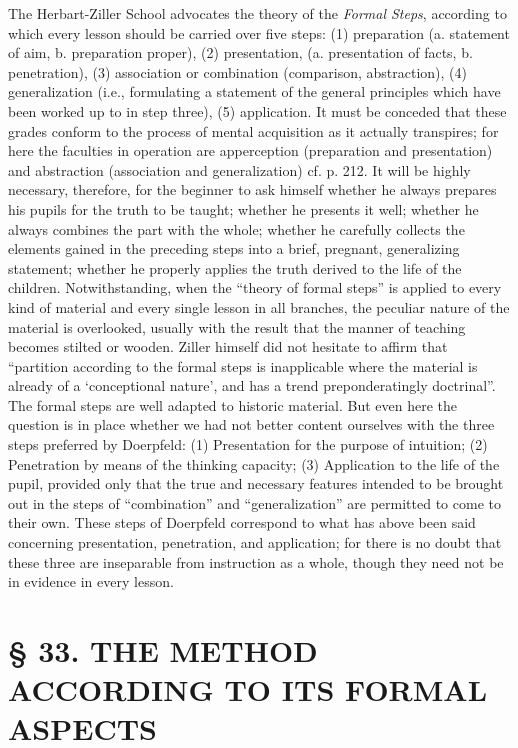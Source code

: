 The Herbart-Ziller School advocates the theory of the \emph{Formal Steps}, according to which every lesson should be carried over five steps: (1) preparation (a. statement of aim, b. preparation proper), (2) presentation, (a. presentation of facts, b. penetration), (3) association or combination (comparison,
abstraction), (4) generalization (i.e., formulating a statement of the general principles which have been worked up to in step three), (5) application. It must be conceded that these grades conform to the process of mental acquisition as it actually transpires; for here the faculties in operation are apperception (preparation and presentation) and abstraction (association and generalization) cf. p. 212. It will be highly necessary, therefore, for the beginner to ask himself whether he always prepares his pupils for the truth to be taught; whether he presents it well; whether he always combines the part with the whole; whether he carefully collects the elements gained in the preceding steps into a brief, pregnant, generalizing statement; whether he properly applies the truth derived to the life of the children. Notwithstanding, when the “theory of formal steps” is applied to every kind of material and every single lesson in all branches, the peculiar nature of the material is overlooked, usually with the result that the manner of teaching becomes stilted or wooden. Ziller himself did not hesitate to affirm that “partition according to the formal steps is inapplicable where the material is already of a ‘conceptional nature’, and has a trend preponderatingly doctrinal”. The formal steps are well adapted to historic material. But even here the question is in place whether we had not better content ourselves with the three steps preferred by Doerpfeld: (1) Presentation for the purpose of intuition; (2) Penetration by means of the thinking capacity; (3) Application to the life of the pupil, provided only that the true and necessary features intended to be brought out in the steps of “combination” and “generalization” are permitted to come to their own. These steps of Doerpfeld correspond to what has above been said concerning presentation, penetration, and application; for there is no doubt that these three are inseparable from instruction as a whole, though they need not be in evidence in every lesson.

\chapter[§ 33. THE METHOD: ITS FORMAL ASPECTS]{§ 33. THE METHOD ACCORDING TO ITS FORMAL ASPECTS}

